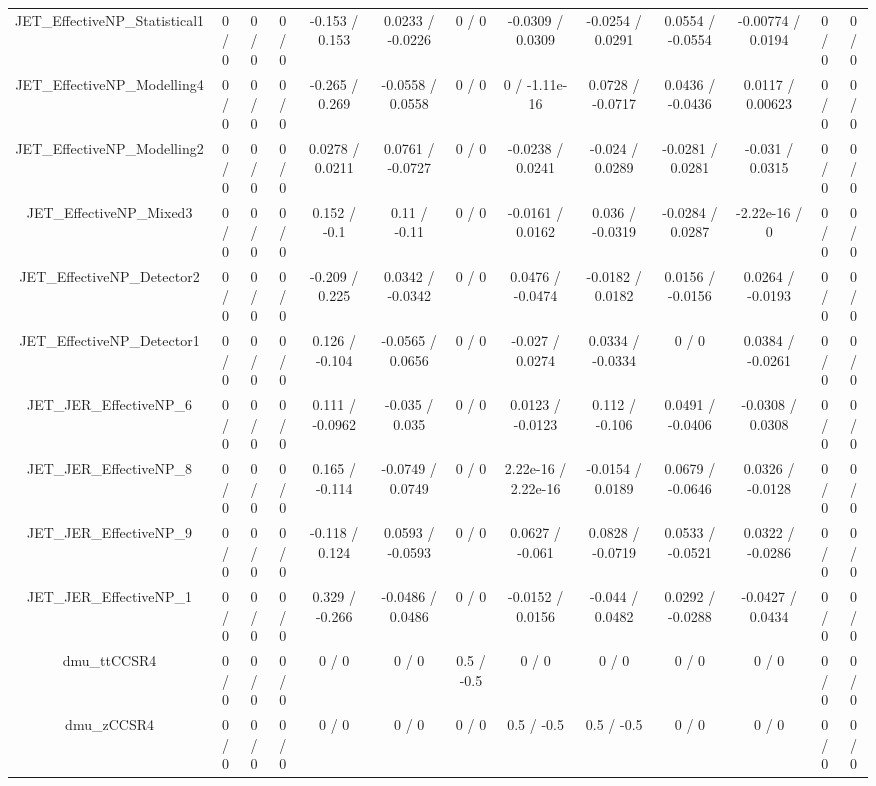 \documentclass[10pt]{article}
\begin{document}
\begin{table}[htbp]
\begin{center}
\begin{tabular}{|c|c|c|c|c|c|c|c|c|c|c|c|c|}
  JET_EffectiveNP_Statistical1 & 0 / 0 & 0 / 0 & 0 / 0 & -0.153 / 0.153 & 0.0233 / -0.0226 & 0 / 0 & -0.0309 / 0.0309 & -0.0254 / 0.0291 & 0.0554 / -0.0554 & -0.00774 / 0.0194 & 0 / 0 & 0 / 0 \\ 
  JET_EffectiveNP_Modelling4 & 0 / 0 & 0 / 0 & 0 / 0 & -0.265 / 0.269 & -0.0558 / 0.0558 & 0 / 0 & 0 / -1.11e-16 & 0.0728 / -0.0717 & 0.0436 / -0.0436 & 0.0117 / 0.00623 & 0 / 0 & 0 / 0 \\ 
  JET_EffectiveNP_Modelling2 & 0 / 0 & 0 / 0 & 0 / 0 & 0.0278 / 0.0211 & 0.0761 / -0.0727 & 0 / 0 & -0.0238 / 0.0241 & -0.024 / 0.0289 & -0.0281 / 0.0281 & -0.031 / 0.0315 & 0 / 0 & 0 / 0 \\ 
  JET_EffectiveNP_Mixed3 & 0 / 0 & 0 / 0 & 0 / 0 & 0.152 / -0.1 & 0.11 / -0.11 & 0 / 0 & -0.0161 / 0.0162 & 0.036 / -0.0319 & -0.0284 / 0.0287 & -2.22e-16 / 0 & 0 / 0 & 0 / 0 \\ 
  JET_EffectiveNP_Detector2 & 0 / 0 & 0 / 0 & 0 / 0 & -0.209 / 0.225 & 0.0342 / -0.0342 & 0 / 0 & 0.0476 / -0.0474 & -0.0182 / 0.0182 & 0.0156 / -0.0156 & 0.0264 / -0.0193 & 0 / 0 & 0 / 0 \\ 
  JET_EffectiveNP_Detector1 & 0 / 0 & 0 / 0 & 0 / 0 & 0.126 / -0.104 & -0.0565 / 0.0656 & 0 / 0 & -0.027 / 0.0274 & 0.0334 / -0.0334 & 0 / 0 & 0.0384 / -0.0261 & 0 / 0 & 0 / 0 \\ 
  JET_JER_EffectiveNP_6 & 0 / 0 & 0 / 0 & 0 / 0 & 0.111 / -0.0962 & -0.035 / 0.035 & 0 / 0 & 0.0123 / -0.0123 & 0.112 / -0.106 & 0.0491 / -0.0406 & -0.0308 / 0.0308 & 0 / 0 & 0 / 0 \\ 
  JET_JER_EffectiveNP_8 & 0 / 0 & 0 / 0 & 0 / 0 & 0.165 / -0.114 & -0.0749 / 0.0749 & 0 / 0 & 2.22e-16 / 2.22e-16 & -0.0154 / 0.0189 & 0.0679 / -0.0646 & 0.0326 / -0.0128 & 0 / 0 & 0 / 0 \\ 
  JET_JER_EffectiveNP_9 & 0 / 0 & 0 / 0 & 0 / 0 & -0.118 / 0.124 & 0.0593 / -0.0593 & 0 / 0 & 0.0627 / -0.061 & 0.0828 / -0.0719 & 0.0533 / -0.0521 & 0.0322 / -0.0286 & 0 / 0 & 0 / 0 \\ 
  JET_JER_EffectiveNP_1 & 0 / 0 & 0 / 0 & 0 / 0 & 0.329 / -0.266 & -0.0486 / 0.0486 & 0 / 0 & -0.0152 / 0.0156 & -0.044 / 0.0482 & 0.0292 / -0.0288 & -0.0427 / 0.0434 & 0 / 0 & 0 / 0 \\ 
  dmu_ttCCSR4 & 0 / 0 & 0 / 0 & 0 / 0 & 0 / 0 & 0 / 0 & 0.5 / -0.5 & 0 / 0 & 0 / 0 & 0 / 0 & 0 / 0 & 0 / 0 & 0 / 0 \\ 
  dmu_zCCSR4 & 0 / 0 & 0 / 0 & 0 / 0 & 0 / 0 & 0 / 0 & 0 / 0 & 0.5 / -0.5 & 0.5 / -0.5 & 0 / 0 & 0 / 0 & 0 / 0 & 0 / 0 \\ 

\end{tabular}
\end{center}
\end{table}
\end{document}
